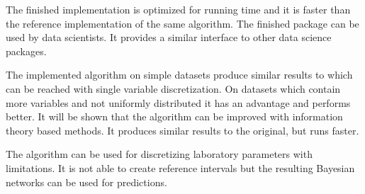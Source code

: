 The finished implementation is optimized for running time and it is faster than the reference implementation of the same algorithm. The finished package can be used by data scientists. It provides a similar interface to other data science packages.

The implemented algorithm on simple datasets produce similar results to which can be reached with single variable discretization. On datasets which contain more variables and not uniformly distributed it has an advantage and performs better. It will be shown that the algorithm can be improved with information theory based methods. It produces similar results to the original, but runs faster.

The algorithm can be used for discretizing laboratory parameters with limitations. It is not able to create reference intervals but the resulting Bayesian networks can be used for predictions.

\vfill

\setcounter{romanPage}{\value{page}}
